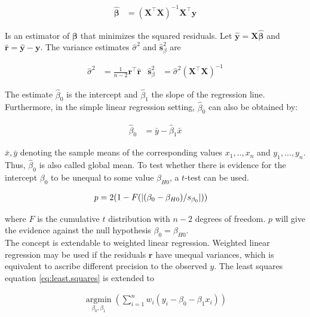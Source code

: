 \documentclass[11pt,a4paper,twoside]{book}\usepackage[]{graphicx}\usepackage[]{color}
\begin{document}
\begin{align}
\hat{\mathbf{\beta}} &= (\mathbf{X}^\top \mathbf{X})^{-1} \mathbf{X}^\top \mathbf{y} \label{eq:regression.parameters}
\end{align}

Is an estimator of $\mathbf{\beta}$ that minimizes the squared residuals. Let $\hat{\mathbf{y}} = \mathbf{X}\hat{\mathbf{\beta}}$ and $\hat{\mathbf{r}} = \hat{\mathbf{y}} - \mathbf{y}$. The variance estimates $\hat{\sigma}^2$ and $\hat{\mathbf{s}}_\beta^2$ are

\begin{align}
\hat{\sigma}^2 &= \frac{1}{n-2}\mathbf{r}^\top \hat{\mathbf{r}} & \hat{\mathbf{s}}_\beta^2 &= \hat{\sigma}^2 (\mathbf{X}^\top \mathbf{X})^{-1} \label{eq:regression.variances}
\end{align}

The estimate $\hat{\beta}_0$ is the intercept and $\hat{\beta}_1$ the slope of the regression line. Furthermore, in the simple linear regression setting, $\hat{\beta}_0$ can also be obtained by:

\begin{align}
\hat{\beta}_0 &= \bar{y} - \hat{\beta}_1 \bar{x} \nonumber
\end{align}

$\bar{x}, \bar{y}$ denoting the sample means of the corresponding values $x_1, .., x_n$ and $y_1, ..., y_n$. Thus, $\hat{\beta}_0$ is also called global mean.
To test whether there is evidence for the intercept $\beta_0$ to be unequal to some value $\beta_{H0}$, a $t$-test can be used. 

\begin{align}
p &= 2(1-F(\left\lvert(\beta_0 - \beta_{H0})/s_{\beta_0}\right\rvert)) \nonumber
\end{align}

where $F$ is the cumulative $t$ distribution with $n-2$ degrees of freedom. $p$ will give the evidence against the null hypothesis $\beta_0 = \beta_{H0}$. \\
The concept is extendable to weighted linear regression. Weighted linear regression may be used if the residuals $\mathbf{r}$ have unequal variances, which is equivalent to ascribe different precision to the observed $y$. The least squares equation \ref{eq:least.squares} is extended to

\begin{align}
\operatorname*{argmin}_{\beta_0, \beta_1}(\sum_{i = 1}^n w_i(y_i - \beta_0 - \beta_1 x_i)) \nonumber
\end{align}
\end{document}
